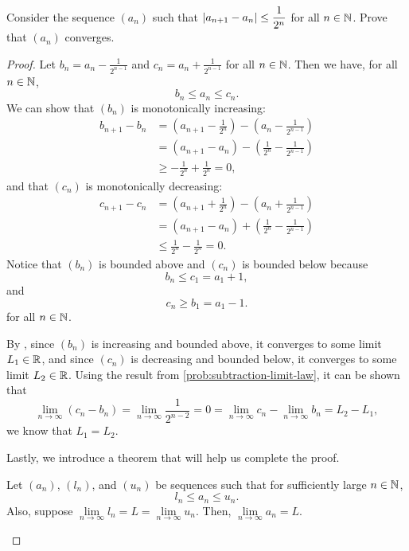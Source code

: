 \begin{problem}
  Consider the sequence $(a_{n})$ such that $\left\lvert a_{n+1} - a_{n} \right\rvert \leq \dfrac{1}{2^{n}}$ 
  for all $n \in \mathbb{N}$. Prove that $(a_{n})$ converges.

  \begin{proof}
    Let $b_{n} = a_{n} - \frac{1}{2^{n-1}}$ and $c_{n} = a_{n} + \frac{1}{2^{n-1}}$
    for all $n \in \mathbb{N}$. Then we have, for all $n \in \mathbb{N}$,
    \[
      b_{n} \leq a_{n} \leq c_{n}.
    \]
    We can show that $(b_{n})$ is monotonically increasing:
    \begin{align*}
      b_{n+1} - b_{n} &= \left( a_{n+1} - \frac{1}{2^{n}} \right) - \left( a_{n} - \frac{1}{2^{n-1}} \right) \\
      &= (a_{n+1} - a_{n}) - \left( \frac{1}{2^{n}} - \frac{1}{2^{n-1}} \right) \\
      &\geq -\frac{1}{2^{n}} + \frac{1}{2^{n}} = 0,
    \end{align*}
    and that $(c_{n})$ is monotonically decreasing:
    \begin{align*}
      c_{n+1} - c_{n} &= \left( a_{n+1} + \frac{1}{2^{n}} \right) - \left( a_{n} + \frac{1}{2^{n-1}} \right) \\
      &= (a_{n+1} - a_{n}) + \left( \frac{1}{2^{n}} - \frac{1}{2^{n-1}} \right) \\
      &\leq \frac{1}{2^{n}} - \frac{1}{2^{n}} = 0.
    \end{align*}
    Notice that $(b_{n})$ is bounded above and $(c_{n})$ is bounded below because
    \[
      b_{n} \leq c_{1} = a_{1} + 1,
    \]
    and 
    \[
      c_{n} \geq b_{1} = a_{1} - 1.
    \]
    for all $n \in \mathbb{N}$.

    By , since $(b_{n})$ is increasing and
    bounded above, it converges to some limit $L_{1} \in \mathbb{R}$, and since $(c_{n})$ is
    decreasing and bounded below, it converges to some limit $L_{2} \in \mathbb{R}$. Using the result from 
    \ref{prob:subtraction-limit-law}, it can be shown that
    \[
      \lim_{n \to \infty} (c_{n} - b_{n}) = \lim_{n \to \infty} \frac{1}{2^{n-2}} = 0 = \lim_{n \to \infty} c_{n} - \lim_{n \to \infty} b_{n} = L_{2} - L_{1}, 
    \]
    we know that $L_{1} = L_{2}$. 

    Lastly, we introduce a theorem that will help us complete the proof.

    \begin{theorem}
      \label{thm:squeeze-theorem-sequences}
      Let $(a_{n})$, $(l_{n})$, and $(u_{n})$ be sequences such that for sufficiently large $n \in \mathbb{N}$,
      \[
        l_{n} \leq a_{n} \leq u_{n}.
      \]
      Also, suppose $\lim\limits_{n \to \infty} l_{n} = L = \lim\limits_{n \to \infty} u_{n}$. 
      Then, $\lim\limits_{n \to \infty} a_{n} = L$.
    \end{theorem}


\end{proof}
\end{problem}

